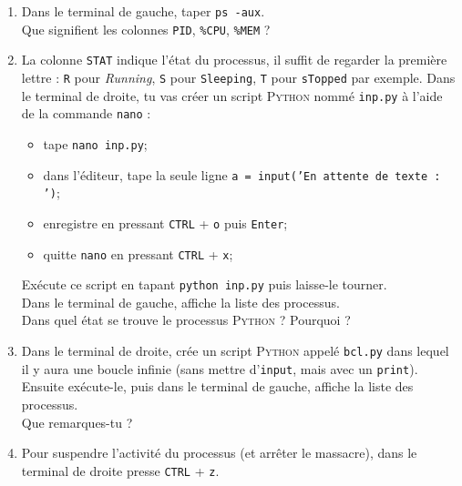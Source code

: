 \documentclass[12pt,a4paper,article,english,firamath]{nsi}
\begin{document}
\begin{enumerate}
    \item Dans le terminal de gauche, taper \texttt{ps -aux}.\\
          Que signifient les colonnes \texttt{PID}, \texttt{\%CPU}, \texttt{\%MEM} ?\\
          
    \item La colonne \texttt{STAT} indique l'état du processus, il suffit de regarder la première lettre : \texttt{R} pour \textit{Running}, \texttt{S} pour \texttt{Sleeping}, \texttt{T} pour \texttt{sTopped} par exemple.
          Dans le terminal de droite, tu vas créer un script \textsc{Python} nommé \texttt{inp.py} à l'aide de la commande \texttt{nano} :
          \begin{itemize}
              \item tape \texttt{nano inp.py};
              \item dans l'éditeur, tape la seule ligne \texttt{a = input('En attente de texte : ')};
              \item enregistre en pressant \texttt{CTRL} + \texttt{o} puis \texttt{Enter};
              \item quitte \texttt{nano} en pressant \texttt{CTRL} + \texttt{x};\\
          \end{itemize}
          Exécute ce script en tapant \texttt{python inp.py} puis laisse-le tourner.\\
          Dans le terminal de gauche, affiche la liste des processus.\\
          Dans quel état se trouve le processus \textsc{Python} ? Pourquoi ?\\
          
    \item Dans le terminal de droite, crée un script \textsc{Python} appelé \texttt{bcl.py} dans lequel il y aura une boucle infinie (sans mettre d'\texttt{input}, mais avec un \texttt{print}).\\
          Ensuite exécute-le, puis dans le terminal de gauche, affiche la liste des processus.\\
          Que remarques-tu ?\\
          
    \item Pour suspendre l'activité du processus (et arrêter le massacre), dans le terminal de droite presse \texttt{CTRL} + \texttt{z}.\\
          

\end{enumerate}
\end{document}
